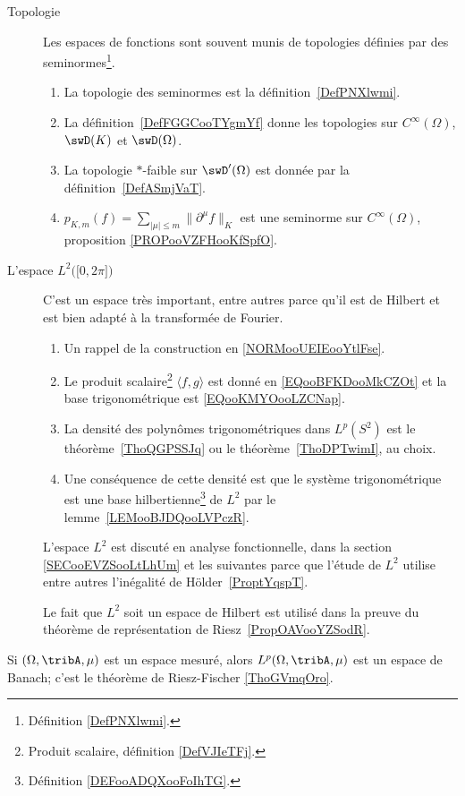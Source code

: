 \begin{description}
	\item[Topologie]

		Les espaces de fonctions sont souvent munis de topologies définies par des seminormes\footnote{Définition \ref{DefPNXlwmi}.}.

		\begin{enumerate}
			\item
			      La topologie des seminormes est la définition~\ref{DefPNXlwmi}.
			\item
			      La définition~\ref{DefFGGCooTYgmYf} donne les topologies sur \(  C^{\infty}(\Omega)\), \( \swD(K)\) et \( \swD(\Omega)\).
			\item
			      La topologie \( *\)-faible sur \( \swD'(\Omega)\) est donnée par la définition~\ref{DefASmjVaT}.
			\item
			      \( p_{K,m}(f)=\sum_{| \mu |\leq m}\| \partial^{\mu}f \|_K\) est une seminorme sur \( C^{\infty}(\Omega)\), proposition \ref{PROPooVZFHooKfSpfO}.
		\end{enumerate}

	\item[L'espace \( { L^2\big( \mathopen[ 0 , 2\pi \mathclose] \big) } \)]

		C'est un espace très important, entre autres parce qu'il est de Hilbert et est bien adapté à la transformée de Fourier.

		\begin{enumerate}
			\item
			      Un rappel de la construction en \ref{NORMooUEIEooYtlFse}.
			\item
			      Le produit scalaire\footnote{Produit scalaire, définition \ref{DefVJIeTFj}.} \( \langle f, g\rangle \) est donné en \eqref{EQooBFKDooMkCZOt} et la base trigonométrique est \eqref{EQooKMYOooLZCNap}.
			\item
			      La densité des polynômes trigonométriques dans \( L^p(S^2)\) est le théorème~\ref{ThoQGPSSJq} ou le théorème~\ref{ThoDPTwimI}, au choix.
			\item
			      Une conséquence de cette densité est que le système trigonométrique est une base hilbertienne\footnote{Définition \ref{DEFooADQXooFoIhTG}.} de \( L^2\) par le lemme~\ref{LEMooBJDQooLVPczR}.
		\end{enumerate}

		L'espace \( L^2\) est discuté en analyse fonctionnelle, dans la section \ref{SECooEVZSooLtLhUm} et les suivantes parce que l'étude de \( L^2\) utilise entre autres l'inégalité de Hölder~\ref{ProptYqspT}.

		Le fait que \( L^2\) soit un espace de Hilbert est utilisé dans la preuve du théorème de représentation de Riesz~\ref{PropOAVooYZSodR}.
\end{description}
Si \( (\Omega,\tribA,\mu)\) est un espace mesuré, alors \( L^p(\Omega,\tribA,\mu)\) est un espace de Banach; c'est le théorème de Riesz-Fischer \ref{ThoGVmqOro}.

